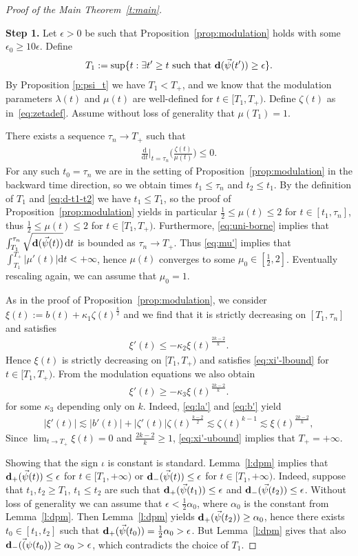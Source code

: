\documentclass[10pt,reqno]{amsart}
\newcommand{\EQ}[1]{\begin{equation}\begin{split} #1 \end{split}\end{equation}}
\numberwithin{equation}{section}
\theoremstyle{remark}
\newcommand{\dd}[1]{\frac{\ud}{\ud{#1}}}
\newcommand{\ud}{\mathrm{d}}
\newcommand{\0}{\emptyset}
\newcommand{\eps}{\epsilon}
\newcommand{\bfd}{{\bf d}}
\begin{document}
\begin{proof}[Proof of the Main Theorem~\ref{t:main}]
~

\noindent
\textbf{Step 1.}
Let $\eps> 0$ be such that Proposition~\ref{prop:modulation} holds
with some $\eps_0 \geq 10\eps$. Define
\EQ{
T_1 := \sup\{t: \exists t' \geq t\text{ such that }\bfd(\vec\psi(t')) \geq \eps\}.
}
By Proposition \ref{p:psi_t} we have $T_1 < T_+$,
and we know that the modulation parameters $\lambda(t)$ and $\mu(t)$
are well-defined for $t \in [T_1, T_+)$. Define $\zeta(t)$ as in~\eqref{eq:zetadef}. 
Assume without loss of generality that $\mu(T_1) = 1$.

There exists a sequence $\tau_n \to T_+$ such that
\EQ{
\dd t\Big|_{t = \tau_n}\Big(\frac{\zeta(t)}{\mu(t)}\Big) \leq 0.
}
For any such $t_0 = \tau_n$ we are in the setting of Proposition~\ref{prop:modulation}
in the backward time direction, so we obtain times $t_1 \leq \tau_n$ and $t_2 \leq t_1$.
By the definition of $T_1$ and \eqref{eq:d-t1-t2} we have $t_1 \leq T_1$,
so the proof of Proposition~\ref{prop:modulation}
yields in particular $\frac 12 \leq \mu(t) \leq 2$ for $t \in [t_1, \tau_n]$,
thus $\frac 12 \leq \mu(t) \leq 2$ for $t \in [T_1, T_+)$.
Furthermore, \eqref{eq:uni-borne}
implies that $\int_{T_1}^{\tau_n}\sqrt{\bfd(\vec\psi(t))}\,\ud t$ is bounded as $\tau_n \to T_+$.
Thus \eqref{eq:mu'} implies that $\int_{T_1}^{T_+} |\mu'(t)|\ud t < +\infty$, hence $\mu(t)$ converges to some $\mu_0 \in [\frac 12, 2]$. Eventually rescaling again, we can assume that $\mu_0 = 1$.

As in the proof of Proposition~\ref{prop:modulation},
we consider $\xi(t) := b(t) + \kappa_1 \zeta(t)^\frac k2$ and we 
find that it is strictly decreasing on $[T_1, \tau_n]$ and satisfies
\EQ{
\xi'(t) \leq -\kappa_2 \xi(t)^\frac{2k-2}{k}. \label{eq:xi'-lbound}
}
Hence $\xi(t)$ is strictly decreasing on $[T_1, T_+)$ and satisfies \eqref{eq:xi'-lbound}
for $t \in [T_1, T_+)$. From the modulation equations we also obtain
\EQ{
\xi'(t) \geq -\kappa_3 \xi(t)^\frac{2k-2}{k}. \label{eq:xi'-ubound}
}
for some $\kappa_3$ depending only on $k$.
Indeed, \eqref{eq:la'} and \eqref{eq:b'} yield
\EQ{
|\xi'(t)| \lesssim |b'(t)| + |\zeta'(t)|\zeta(t)^\frac{k-2}{2} \lesssim \zeta(t)^{k-1} \lesssim \xi(t)^\frac{2k-2}{k},
}
Since $\lim_{t\to T_+} \xi(t) = 0$ and $\frac{2k-2}{k} \geq 1$,
\eqref{eq:xi'-ubound} implies that $T_+ = +\infty$.

Showing that the sign $\iota$ is constant is standard.
Lemma~\ref{l:dpm} implies that $\bfd_+(\vec\psi(t)) \leq \eps$
for $t \in [T_1, +\infty)$ or $\bfd_-(\vec\psi(t)) \leq \eps$ for $t \in [T_1, +\infty)$.
Indeed, suppose that $t_1, t_2 \geq T_1$, $t_1 \leq t_2$ are such that
$\bfd_+(\vec\psi(t_1)) \leq \eps$ and $\bfd_-(\vec\psi(t_2)) \leq \eps$.
Without loss of generality we can assume that $\eps < \frac 12 \alpha_0$,
where $\alpha_0$ is the constant from Lemma~\ref{l:dpm}.
Then Lemma~\ref{l:dpm} yields $\bfd_+(\vec\psi(t_2)) \geq \alpha_0$,
hence there exists $t_0 \in [t_1, t_2]$ such that $\bfd_+(\vec\psi(t_0)) = \frac 12 \alpha_0 > \eps$.
But Lemma~\ref{l:dpm} gives that also $\bfd_-(\vec(\psi(t_0)) \geq \alpha_0 > \eps$,
which contradicts the choice of $T_1$.


\end{proof}
\end{document}
